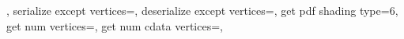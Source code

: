 {{		\pgfpathcurveto	{\expandafter\pgfplotspointpatchvertex\pgfplotspatchclass@coons@H\endvertex}%
						{\expandafter\pgfplotspointpatchvertex\pgfplotspatchclass@coons@I\endvertex}%
						{\expandafter\pgfplotspointpatchvertex\pgfplotspatchclass@coons@J\endvertex}%
		\pgfpathcurveto	{\expandafter\pgfplotspointpatchvertex\pgfplotspatchclass@coons@K\endvertex}%
						{\expandafter\pgfplotspointpatchvertex\pgfplotspatchclass@coons@L\endvertex}%
						{\expandafter\pgfplotspointpatchvertex\pgfplotspatchclass@coons@A\endvertex}%
		\pgfpathclose
	},
	serialize except vertices=\let\pgfplotsretval\pgfutil@empty,%
	deserialize except vertices=,
	get pdf shading type=6,
	get num vertices=\def\pgfplotsretval{12},
	get num cdata vertices=\def\pgfplotsretval{4},
}%

